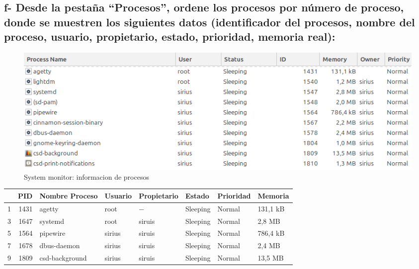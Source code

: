 \documentclass{article}
\begin{document}
\subsection*{f- Desde la pestaña “Procesos”, ordene los procesos por número de proceso, donde se muestren los
siguientes datos (identificador del procesos, nombre del proceso, usuario, propietario, estado,
prioridad, memoria real):}

\begin{figure}[h]
  \centering
  \includegraphics[width=1\textwidth]{resources/ej2f.png}
  \caption{System monitor: informacion de procesos}
\end{figure}

\begin{table}[htbp]
  \centering
    \begin{tabular}{|rrllllll|}
    \toprule
    \rowcolor[rgb]{ .357,  .608,  .835} \multicolumn{1}{|l}{\textcolor[rgb]{ 1,  1,  1}{\textbf{Proceso}}} & \multicolumn{1}{l}{\textcolor[rgb]{ 1,  1,  1}{\textbf{PID}}} & \textcolor[rgb]{ 1,  1,  1}{\textbf{Nombre Proceso}} & \textcolor[rgb]{ 1,  1,  1}{\textbf{Usuario}} & \textcolor[rgb]{ 1,  1,  1}{\textbf{Propietario}} & \textcolor[rgb]{ 1,  1,  1}{\textbf{Estado}} & \textcolor[rgb]{ 1,  1,  1}{\textbf{Prioridad}} & \textcolor[rgb]{ 1,  1,  1}{\textbf{Memoria}} \\
    \midrule
    \rowcolor[rgb]{ .867,  .922,  .969} 1     & 1431  & agetty & root  & $-$     & Sleeping & Normal & 131,1 kB \\
    \midrule
    3     & 1647  & systemd & root  & siruis & Sleeping & Normal & 2,8 MB \\
    \midrule
    \rowcolor[rgb]{ .867,  .922,  .969} 5     & 1564  & pipewire & sirius & siruis & Sleeping & Normal & 786,4 kB \\
    \midrule
    7     & 1678  & dbus-daemon & sirius & siruis & Sleeping & Normal & 2,4 MB \\
    \midrule
    \rowcolor[rgb]{ .867,  .922,  .969} 9     & 1809  & csd-background & sirius & siruis & Sleeping & Normal & 13,5 MB \\
    \bottomrule
    \end{tabular}%
  \label{tab:addlabel}%
\end{table}%
\end{document}
